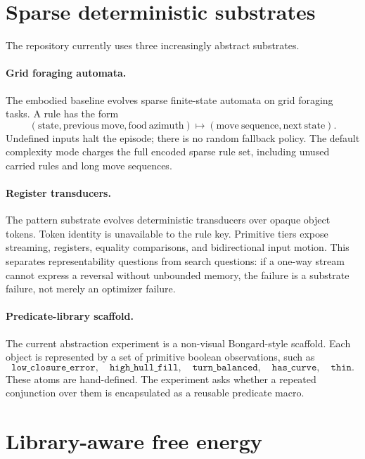 \documentclass[11pt]{article}
\begin{document}
\section{Sparse deterministic substrates}

The repository currently uses three increasingly abstract substrates.

\paragraph{Grid foraging automata.}
The embodied baseline evolves sparse finite-state automata on grid foraging
tasks. A rule has the form
\begin{equation}
  (\mathrm{state},\mathrm{previous\ move},\mathrm{food\ azimuth})
  \mapsto
  (\mathrm{move\ sequence},\mathrm{next\ state}).
\end{equation}
Undefined inputs halt the episode; there is no random fallback policy. The
default complexity mode charges the full encoded sparse rule set, including
unused carried rules and long move sequences.

\paragraph{Register transducers.}
The pattern substrate evolves deterministic transducers over opaque object
tokens. Token identity is unavailable to the rule key. Primitive tiers expose
streaming, registers, equality comparisons, and bidirectional input motion. This
separates representability questions from search questions: if a one-way stream
cannot express a reversal without unbounded memory, the failure is a substrate
failure, not merely an optimizer failure.

\paragraph{Predicate-library scaffold.}
The current abstraction experiment is a non-visual Bongard-style scaffold. Each
object is represented by a set of primitive boolean observations, such as
\begin{equation}
  \texttt{low\_closure\_error},\quad
  \texttt{high\_hull\_fill},\quad
  \texttt{turn\_balanced},\quad
  \texttt{has\_curve},\quad
  \texttt{thin}.
\end{equation}
These atoms are hand-defined. The experiment asks whether a repeated conjunction
over them is encapsulated as a reusable predicate macro.

\section{Library-aware free energy}
\end{document}
